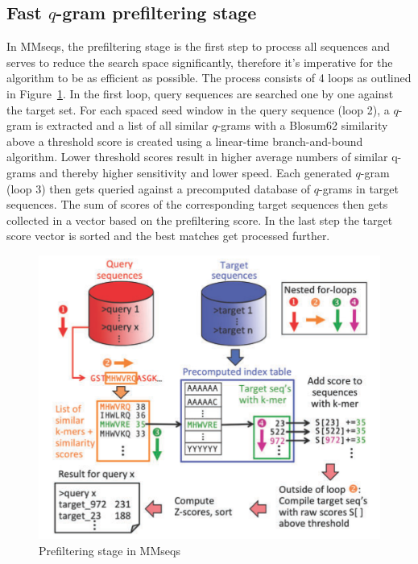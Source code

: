 \documentclass[twoside,a4paper,bsc]{master}
\newcommand{\Qgram}[1]{\(#1\)-gram}
\begin{document}
\subsection{Fast \Qgram{q} prefiltering stage}
In MMseqs, the prefiltering stage is the first step to process all
sequences and serves to reduce the search space significantly, therefore
it's imperative for the algorithm to be as efficient as possible. The
process consists of 4 loops as outlined in
Figure~\ref{fig:prefilterMMseqs}. In the first loop, query sequences are
searched one by one against the target set. For each spaced seed window in
the query sequence (loop 2), a \Qgram{q} is extracted and a list of all
similar \Qgram{q}s with a Blosum62 similarity above a threshold score is
created using a linear-time branch-and-bound algorithm. Lower threshold
scores result in higher average numbers of similar q-grams and thereby
higher sensitivity and lower speed. Each generated \Qgram{q} (loop 3) then
gets queried against a precomputed database of \Qgram{q}s in target
sequences. The sum of scores of the corresponding target sequences then
gets collected in a vector based on the prefiltering score. In the last
step the target score vector is sorted and the best matches get processed
further.
\begin{figure}[t]
\begin{center}
\includegraphics[scale=0.3]{graphics/MMseqs_prefilter.png}
\end{center}
\caption{Prefiltering stage in MMseqs~\cite{hauser2014mmseqs}}
\label{fig:prefilterMMseqs}
\end{figure}
\end{document}
